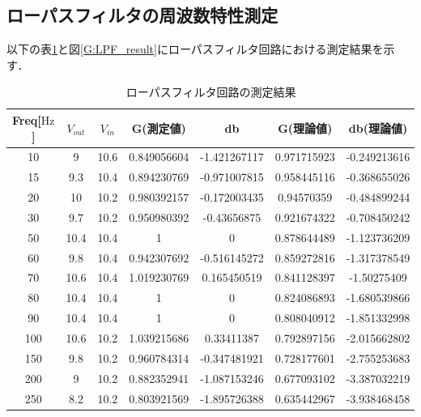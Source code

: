 \documentclass[a4paper,11pt]{jsarticle}
\begin{document}
\subsection{ローパスフィルタの周波数特性測定}
以下の表\ref{T:LPF_result}と図\ref{G:LPF_result}にローパスフィルタ回路における測定結果を示す．
\begin{center}
  \begin{longtable}{|c|c|c|c|c|c|c|}
    \caption{ローパスフィルタ回路の測定結果}
    \label{T:LPF_result}
    \endhead
    \hline
    Freq[$\si{\hertz}$] & $V_{out}$ & $V_{in}$ & G(測定値)   & db           & G(理論値)   & db(理論値)   \\ \hline
    10                  & 9         & 10.6     & 0.849056604 & -1.421267117 & 0.971715923 & -0.249213616 \\ \hline
    15                  & 9.3       & 10.4     & 0.894230769 & -0.971007815 & 0.958445116 & -0.368655026 \\ \hline
    20                  & 10        & 10.2     & 0.980392157 & -0.172003435 & 0.94570359  & -0.484899244 \\ \hline
    30                  & 9.7       & 10.2     & 0.950980392 & -0.43656875  & 0.921674322 & -0.708450242 \\ \hline
    50                  & 10.4      & 10.4     & 1           & 0            & 0.878644489 & -1.123736209 \\ \hline
    60                  & 9.8       & 10.4     & 0.942307692 & -0.516145272 & 0.859272816 & -1.317378549 \\ \hline
    70                  & 10.6      & 10.4     & 1.019230769 & 0.165450519  & 0.841128397 & -1.50275409  \\ \hline
    80                  & 10.4      & 10.4     & 1           & 0            & 0.824086893 & -1.680539866 \\ \hline
    90                  & 10.4      & 10.4     & 1           & 0            & 0.808040912 & -1.851332998 \\ \hline
    100                 & 10.6      & 10.2     & 1.039215686 & 0.33411387   & 0.792897156 & -2.015662802 \\ \hline
    150                 & 9.8       & 10.2     & 0.960784314 & -0.347481921 & 0.728177601 & -2.755253683 \\ \hline
    200                 & 9         & 10.2     & 0.882352941 & -1.087153246 & 0.677093102 & -3.387032219 \\ \hline
    250                 & 8.2       & 10.2     & 0.803921569 & -1.895726388 & 0.635442967 & -3.938468458 \\ \hline

\end{longtable}
\end{center}
\end{document}
